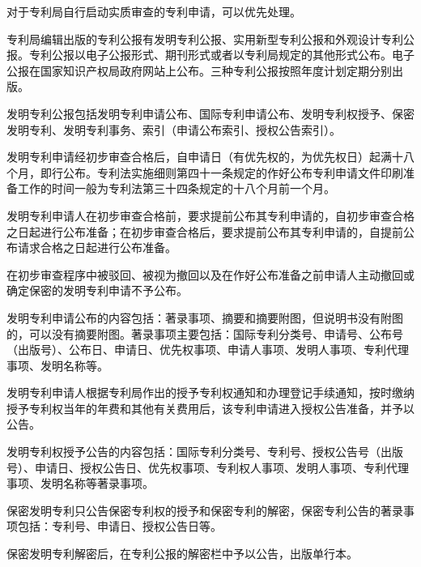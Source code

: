 对于专利局自行启动实质审查的专利申请，可以优先处理。

专利局编辑出版的专利公报有发明专利公报、实用新型专利公报和外观设计专利公报。专利公报以电子公报形式、期刊形式或者以专利局规定的其他形式公布。电子公报在国家知识产权局政府网站上公布。三种专利公报按照年度计划定期分别出版。

发明专利公报包括发明专利申请公布、国际专利申请公布、发明专利权授予、保密发明专利、发明专利事务、索引（申请公布索引、授权公告索引）。

发明专利申请经初步审查合格后，自申请日（有优先权的，为优先权日）起满十八个月，即行公布。专利法实施细则第四十一条规定的作好公布专利申请文件印刷准备工作的时间一般为专利法第三十四条规定的十八个月前一个月。

发明专利申请人在初步审查合格前，要求提前公布其专利申请的，自初步审查合格之日起进行公布准备；在初步审查合格后，要求提前公布其专利申请的，自提前公布请求合格之日起进行公布准备。

在初步审查程序中被驳回、被视为撤回以及在作好公布准备之前申请人主动撤回或确定保密的发明专利申请不予公布。

发明专利申请公布的内容包括：著录事项、摘要和摘要附图，但说明书没有附图的，可以没有摘要附图。著录事项主要包括：国际专利分类号、申请号、公布号（出版号）、公布日、申请日、优先权事项、申请人事项、发明人事项、专利代理事项、发明名称等。

发明专利申请人根据专利局作出的授予专利权通知和办理登记手续通知，按时缴纳授予专利权当年的年费和其他有关费用后，该专利申请进入授权公告准备，并予以公告。

发明专利权授予公告的内容包括：国际专利分类号、专利号、授权公告号（出版号）、申请日、授权公告日、优先权事项、专利权人事项、发明人事项、专利代理事项、发明名称等著录事项。

保密发明专利只公告保密专利权的授予和保密专利的解密，保密专利公告的著录事项包括：专利号、申请日、授权公告日等。

保密发明专利解密后，在专利公报的解密栏中予以公告，出版单行本。


